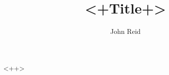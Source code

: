 \documentclass[a4paper]{article}
\title{<+Title+>}
\author{John Reid}
\begin{document}
<++>

\printbibliography
\end{document}
